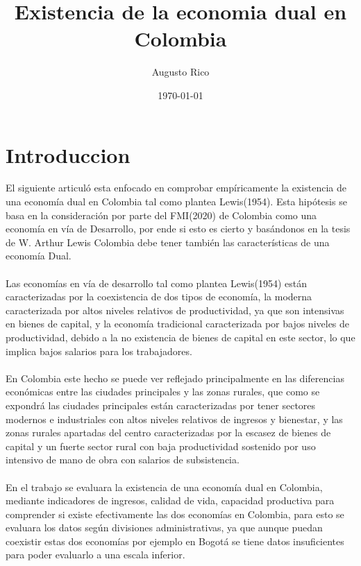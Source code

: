 \documentclass[12pt,letterpaper]{article}
\title{\textbf{Existencia de la economia dual en Colombia}}
\author{Augusto Rico}
\date{\today}
\begin{document}
\maketitle
\section{Introduccion}

\begin{flushleft}   


El siguiente articuló esta enfocado en comprobar empíricamente la existencia de una economía dual en Colombia tal como plantea Lewis(1954).
Esta hipótesis se basa en la consideración por parte del FMI(2020) de Colombia como una economía en vía de Desarrollo, por ende si esto es cierto 
y basándonos en la tesis de W. Arthur Lewis Colombia debe tener también las características de una economía Dual.\\
~\\
Las economías en vía de desarrollo tal como plantea Lewis(1954) están caracterizadas por la coexistencia de dos tipos de economía, la moderna caracterizada
por altos niveles relativos de productividad, ya que son intensivas en bienes de capital, y la economía tradicional caracterizada por bajos niveles de productividad, 
debido a la no existencia de bienes de capital en este sector, lo que implica bajos salarios para los trabajadores.\\
~\\
En Colombia este hecho se puede ver reflejado principalmente en las diferencias económicas entre las ciudades principales y las zonas rurales, que como se expondrá
las ciudades principales están caracterizadas por tener sectores modernos e industriales con altos niveles relativos de ingresos y bienestar, y las zonas rurales
apartadas del centro caracterizadas por la escasez de bienes de capital y un fuerte sector rural con baja productividad sostenido por uso intensivo de mano de obra con salarios de subsistencia.\\
~\\
En el trabajo se evaluara la existencia de una economía dual en Colombia, mediante indicadores de ingresos, calidad de vida, capacidad productiva para comprender si
existe efectivamente las dos economías en Colombia, para esto se evaluara los datos según divisiones administrativas, ya que aunque puedan coexistir estas dos economías por ejemplo en Bogotá
se tiene datos insuficientes para poder evaluarlo a una escala inferior.\\

\end{flushleft}
\end{document}

